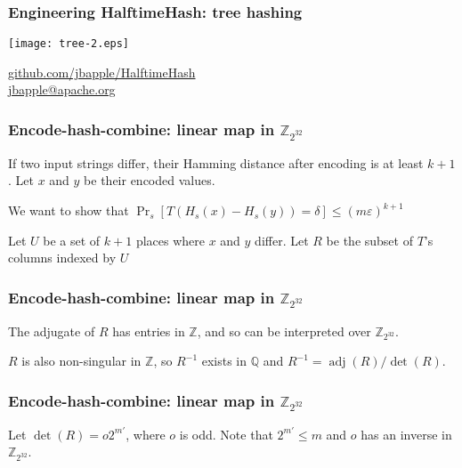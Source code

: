 \documentclass[xcolor=dvipsnames]{beamer}
\DeclareMathOperator{\adj}{adj}
\begin{document}
\begin{frame}
  \frametitle{Engineering HalftimeHash: tree hashing}
  \begin{center}
    \texttt{[image: tree-2.eps]}
  \end{center}
\end{frame}

\begin{frame}
  \begin{center}
    \href{https://github.com/jbapple/HalftimeHash}{github.com/jbapple/HalftimeHash}
    $ $ \\
    $ $ \\
    \href{mailto:jbapple@apache.org}{\Large jbapple@apache.org}
  \end{center}
\end{frame}

\begin{frame}
  \frametitle{Encode-hash-combine: linear map \textbf{ in $\mathbb{Z}_{2^{32}}$}}

  If two input strings differ, their Hamming distance after encoding is at least $k+1$.
  Let $x$ and $y$ be their encoded values.
  \pause

  $ $\\
  We want to show that $\Pr_s\left[T(H_s(x)-H_s(y)) = \delta\right] \le (m \varepsilon)^{k+1}$
  \pause

  $ $\\
  Let $U$ be a set of $k+1$ places where $x$ and $y$ differ.
  Let $R$ be the subset of $T$'s columns indexed by $U$
\end{frame}

\begin{frame}
  \frametitle{Encode-hash-combine: linear map \textbf{ in $\mathbb{Z}_{2^{32}}$}}

  The adjugate of $R$ has entries in $\mathbb{Z}$, and so can be interpreted over $\mathbb{Z}_{2^{32}}$.
  \pause

  $ $\\
  $R$ is also non-singular in $\mathbb{Z}$, so $R^{-1}$ exists in $\mathbb{Q}$ and $R^{-1} = \adj(R) / \det(R)$.
\end{frame}

\begin{frame}
  \frametitle{Encode-hash-combine: linear map \textbf{in $\mathbb{Z}_{2^{32}}$}}

  $ $\\
  Let $\det(R) = o 2^{m'}$, where $o$ is odd. Note that $2^{m'} \le m$ and $o$ has an inverse in $\mathbb{Z}_{2^{32}}$.

\end{frame}
\end{document}
